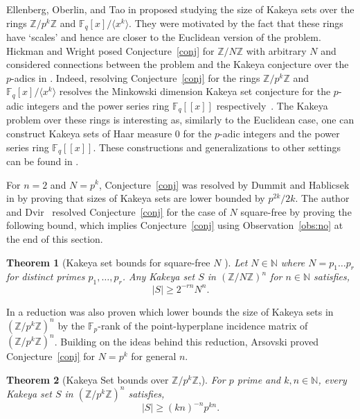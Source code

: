 \documentclass[11pt]{article}
\numberwithin{equation}{section}
\newtheorem{thm}{Theorem}[section]
\def\F{{\mathbb{F}}}
\def\Z{{\mathbb{Z}}}
\def\N{{\mathbb{N}}}
\begin{document}
Ellenberg, Oberlin, and Tao in \cite{ellenberg2010kakeya} proposed studying the size of Kakeya sets over the rings $\Z/p^k\Z$ and $\F_q[x]/\langle x^k\rangle$. They were motivated by the fact that these rings have `scales' and hence are closer to the Euclidean version of the problem. Hickman and Wright posed Conjecture~\ref{conj} for $\Z/N\Z$ with arbitrary $N$ and considered connections between the problem and the Kakeya conjecture over the $p$-adics in \cite{hickman2018fourier}. Indeed, resolving Conjecture~\ref{conj} for the rings $\Z/p^k\Z$ and $\F_q[x]/\langle x^k\rangle$ resolves the Minkowski dimension Kakeya set conjecture for the $p$-adic integers and the power series ring $\F_q[[x]]$ respectively~\cite{ellenberg2010kakeya,dummithablicsek2013,hickman2018fourier}. The Kakeya problem over these rings is interesting as, similarly to the Euclidean case, one can construct Kakeya sets of Haar measure $0$ for the $p$-adic integers and the power series ring $\F_q[[x]]$. These constructions and generalizations to other settings can be found in \cite{dummithablicsek2013,Fraser_2016,CML_2018__10_1_3_0,hickman2018fourier}.

For $n=2$ and $N=p^k$, Conjecture~\ref{conj} was resolved by Dummit and Hablicsek in \cite{dummithablicsek2013} by proving that sizes of Kakeya sets are lower bounded by $p^{2k}/2k$. The author and Dvir~\cite{dhar2021proof} resolved Conjecture~\ref{conj} for the case of $N$ square-free by proving the following bound, which implies Conjecture~\ref{conj} using Observation~\ref{obs:no} at the end of this section.

\begin{thm}[Kakeya set bounds for square-free $N$ {\cite[Theorem~1.3]{dhar2021proof}}]\label{squarefr}
Let $N\in \N$ where $N=p_1\hdots p_r$ for distinct primes $p_1,\hdots,p_r$. Any Kakeya set $S$ in $(\Z/N\Z)^n$ for $n\in \N$ satisfies,
$$|S|\ge 2^{-rn}N^n.$$
\end{thm}

In \cite{dhar2021proof} a reduction was also proven which lower bounds the size of Kakeya sets in $(\Z/p^k\Z)^n$ by the $\F_p$-rank of the point-hyperplane incidence matrix of $(\Z/p^k\Z)^n$. Building on the ideas behind this reduction, Arsovski proved Conjecture~\ref{conj} for $N=p^k$ for general $n$.

\begin{thm}[Kakeya Set bounds over $\Z/p^k\Z$,{\cite[Theorem~2]{arsovski2021padic}}]\label{power}
For $p$ prime and $k,n\in \N$, every Kakeya set $S$ in $(\Z/p^k\Z)^n$ satisfies,
$$|S|\ge (kn)^{-n} p^{kn}.$$
\end{thm}
\end{document}
